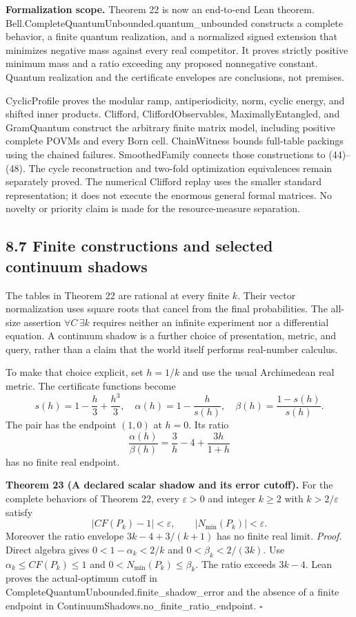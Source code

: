 \documentclass[
]{article}
\begin{document}
\textbf{Formalization scope.} Theorem 22 is now an end-to-end Lean theorem.
Bell.CompleteQuantumUnbounded.quantum\_unbounded constructs a complete
behavior, a finite quantum realization, and a normalized signed extension
that minimizes negative mass against every real competitor. It proves
strictly positive minimum mass and a ratio exceeding any proposed
nonnegative constant. Quantum realization and the certificate envelopes
are conclusions, not premises.

CyclicProfile proves the modular ramp, antiperiodicity, norm, cyclic
energy, and shifted inner products. Clifford, CliffordObservables,
MaximallyEntangled, and GramQuantum construct the arbitrary finite
matrix model, including positive complete POVMs and every Born cell.
ChainWitness bounds full-table packings using the chained failures.
SmoothedFamily connects those constructions to (44)--(48).
The cycle reconstruction and two-fold optimization equivalences remain
separately proved. The numerical Clifford replay uses the smaller
standard representation; it does not execute the enormous general
formal matrices. No novelty or priority claim is made for the
resource-measure separation.

\subsection{8.7 Finite constructions and selected continuum shadows}\label{finite-constructions-and-selected-continuum-shadows}

The tables in Theorem 22 are rational at every finite \(k\). Their vector
normalization uses square roots that cancel from the final probabilities.
The all-size assertion \(\forall C\,\exists k\) requires neither an infinite
experiment nor a differential equation. A continuum shadow is a further
choice of presentation, metric, and query, rather than a claim that the
world itself performs real-number calculus.

To make that choice explicit, set \(h=1/k\) and use the usual Archimedean
real metric. The certificate functions become
\[
s(h)=1-\frac h3+\frac{h^3}3,\quad
\alpha(h)=1-\frac h{s(h)},\quad
\beta(h)=\frac{1-s(h)}{s(h)}.
\]
The pair has the endpoint \((1,0)\) at \(h=0\). Its ratio
\[
\frac{\alpha(h)}{\beta(h)}
 =\frac3h-4+\frac{3h}{1+h}
\]
has no finite real endpoint.

\textbf{Theorem 23 (A declared scalar shadow and its error cutoff).} For the
complete behaviors of Theorem 22, every \(\varepsilon>0\) and integer
\(k\ge2\) with \(k>2/\varepsilon\) satisfy
\[
|CF(P_k)-1|<\varepsilon,\qquad
|N_{\min}(P_k)|<\varepsilon.
\]
Moreover the ratio envelope \(3k-4+3/(k+1)\) has no finite real limit.
\emph{Proof.} Direct algebra gives
\(0<1-\alpha_k<2/k\) and \(0<\beta_k<2/(3k)\).
Use \(\alpha_k\le CF(P_k)\le1\) and
\(0<N_{\min}(P_k)\le\beta_k\). The ratio exceeds \(3k-4\).
Lean proves the actual-optimum cutoff in
CompleteQuantumUnbounded.finite\_shadow\_error and the absence of a finite
endpoint in ContinuumShadows.no\_finite\_ratio\_endpoint. \(\square\)
\end{document}

